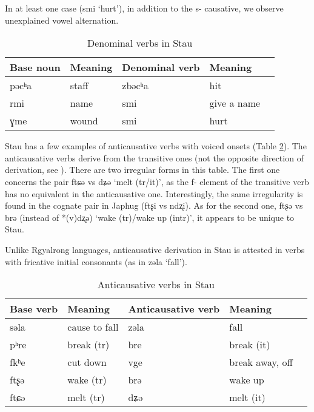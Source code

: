 \documentclass[oneside,a4paper,11pt]{article}
\newcommand{\ipa}[1]{{\phon #1}} %
\begin{document}
In at least one case (\ipa{smi} `hurt'), in addition to the \ipa{s-} causative, we observe unexplained vowel alternation. 
 
 \begin{table}[H]
 \caption{Denominal verbs in Stau} \label{tab:denominal} \centering 
\begin{tabular}{lllll}
\toprule
Base noun & Meaning & Denominal verb & Meaning \\
\midrule
\ipa{pəcʰa} & staff&\ipa{zbəcʰa} & hit \\
\ipa{rmi} &name &\ipa{smi} &give a name \\
\ipa{ɣme} &wound &\ipa{smi} & hurt \\
\bottomrule
\end{tabular}
\end{table}
 
 
 Stau has a few examples of anticausative verbs with voiced onsets (Table \ref{tab:anticausative}). The anticausative verbs derive from the transitive ones (not the opposite direction of derivation, see \citealt{jacques12demotion}). There are two irregular forms in this table. The first one concerns the pair \ipa{ftɕə} vs \ipa{dʑə} `melt (tr/it)', as the \ipa{f-} element of the transitive verb has no equivalent in the anticausative one. Interestingly, the same irregularity is found in the cognate pair in Japhug (\ipa{ftʂi} vs \ipa{ndʐi}). As for the second one, \ipa{ftʂə} vs \ipa{brə} (instead of *\ipa{(v)dʐə}) `wake (tr)/wake up (intr)', it appears to be unique to Stau.
 
Unlike Rgyalrong languages, anticausative derivation in Stau is attested in verbs with fricative initial consonants (as in \ipa{zəla}  `fall').
 
  \begin{table}[H]
 \caption{Anticausative verbs in Stau} \label{tab:anticausative} \centering 
\begin{tabular}{lllll}
\toprule
Base verb & Meaning & Anticausative verb & Meaning \\
\midrule
 \ipa{səla} &cause to fall & \ipa{zəla}  & fall \\
\ipa{pʰre}   &break (tr) &\ipa{bre}   & break (it) \\
  \ipa{fkʰe} & cut down & \ipa{vge} & break away, off \\
\ipa{ftʂə}& wake (tr) & \ipa{brə}& wake up\\
\ipa{ftɕə} &melt (tr) &\ipa{dʑə} &melt (it)\\
 \bottomrule
\end{tabular}
\end{table}
 
\end{document}
